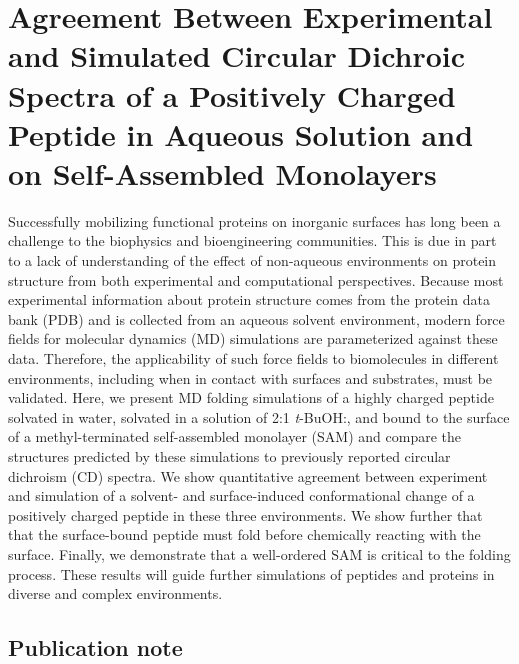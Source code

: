 \chapter{Agreement Between Experimental and Simulated Circular Dichroic Spectra of a Positively Charged Peptide in Aqueous Solution and on Self-Assembled Monolayers}\label{helix-folding}

\newcommand{\tbawat}{{2:1 \emph{t}-BuOH:\ce{H2O}}}
\newcommand{\tba}{{\emph{t}-BuOH}}
\newcommand{\pep}{{\textalpha{}11LK(CH)}}

Successfully mobilizing functional proteins on inorganic surfaces has long been a challenge to the biophysics and bioengineering communities. 
This is due in part to a lack of understanding of the effect of non-aqueous environments on protein structure from both experimental and computational perspectives. 
Because most experimental information about protein structure comes from the protein data bank (PDB) and is collected from an aqueous solvent environment, modern force fields for molecular dynamics (MD) simulations are parameterized against these data. 
Therefore, the applicability of such force fields to biomolecules in different environments, including when in contact with surfaces and substrates, must be validated. 
Here, we present MD folding simulations of a highly charged peptide solvated in water, solvated in a solution of \tbawat{}, and bound to the surface of a methyl-terminated self-assembled monolayer (SAM) and compare the structures predicted by these simulations to previously reported circular dichroism (CD) spectra. 
We show quantitative agreement between experiment and simulation of a solvent- and surface-induced conformational change of a positively charged peptide in these three environments. 
We show further that that the surface-bound peptide must fold before chemically reacting with the surface. 
Finally, we demonstrate that a well-ordered SAM is critical to the folding process. 
These results will guide further simulations of peptides and proteins in diverse and complex environments. 

\section{Publication note} \label{helix-pub-note}

